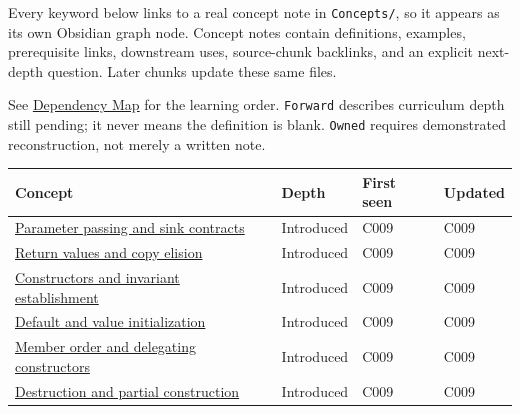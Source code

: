 Every keyword below links to a real concept note in \texttt{Concepts/}, so it appears as its own Obsidian graph node. Concept notes contain definitions, examples, prerequisite links, downstream uses, source-chunk backlinks, and an explicit next-depth question. Later chunks update these same files.

See \hyperref[appendix-4ad47bdd269a]{Dependency Map} for the learning order. \texttt{Forward} describes curriculum depth still pending; it never means the definition is blank. \texttt{Owned} requires demonstrated reconstruction, not merely a written note.

{\def\LTcaptype{none} %
\begin{longtable}[]{@{}
  >{\raggedright\arraybackslash}p{}
  >{\raggedright\arraybackslash}p{}
  >{\raggedright\arraybackslash}p{}
  >{\raggedright\arraybackslash}p{}@{}}
\toprule\noalign{}
\begin{minipage}[b]{\linewidth}\raggedright
Concept
\end{minipage} & \begin{minipage}[b]{\linewidth}\raggedright
Depth
\end{minipage} & \begin{minipage}[b]{\linewidth}\raggedright
First seen
\end{minipage} & \begin{minipage}[b]{\linewidth}\raggedright
Updated
\end{minipage} \\
\midrule\noalign{}
\endhead
\bottomrule\noalign{}
\endlastfoot
\hyperref[appendix-d5908f75721f]{Parameter passing and sink contracts} & Introduced & C009 & C009 \\
\hyperref[appendix-b08d3788c5c6]{Return values and copy elision} & Introduced & C009 & C009 \\
\hyperref[appendix-7f8ec83d0886]{Constructors and invariant establishment} & Introduced & C009 & C009 \\
\hyperref[appendix-ba8c1a9fe03f]{Default and value initialization} & Introduced & C009 & C009 \\
\hyperref[appendix-3cb49709605a]{Member order and delegating constructors} & Introduced & C009 & C009 \\
\hyperref[appendix-9bfe377cef7a]{Destruction and partial construction} & Introduced & C009 & C009 \\

\end{longtable}}

